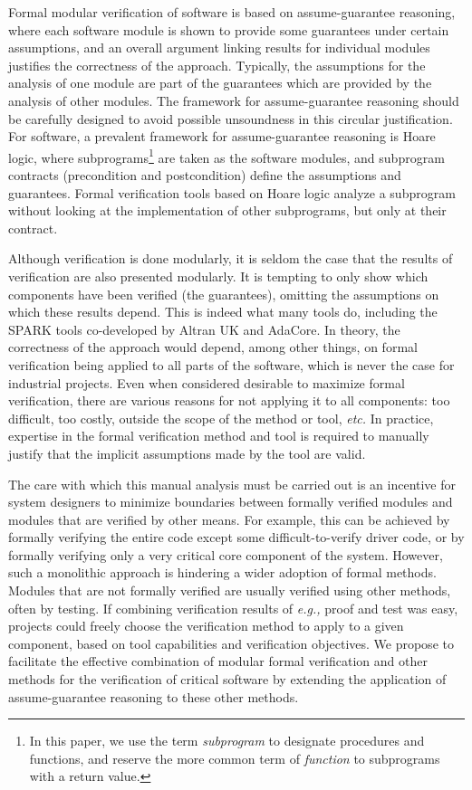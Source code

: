 \documentclass{llncs}
\newcommand{\spark}{SPARK\xspace}
\newcommand{\etc}{\textit{etc.}\xspace}
\newcommand{\eg}{\textit{e.g.,}\xspace}
\begin{document}
Formal modular verification of software is based on assume-guarantee
reasoning, where each software module is shown to provide some guarantees
under certain assumptions, and an overall argument linking results for
individual modules justifies the correctness of the approach. Typically, the
assumptions for the analysis of one module are part of the guarantees which
are provided by the analysis of other modules. The framework for
assume-guarantee reasoning should be carefully designed to avoid possible
unsoundness in this circular justification. For software, a prevalent
framework for assume-guarantee reasoning is Hoare logic, where
subprograms\footnote{In this paper, we use the term
{\em subprogram} to designate procedures and functions, and reserve the more
common term of {\em function} to subprograms with a return value.} are taken
as the software modules, and subprogram contracts (precondition and
postcondition) define the assumptions and guarantees. Formal verification
tools based on Hoare logic analyze a subprogram without looking at the
implementation of other subprograms, but only at their contract.

Although verification is done modularly, it is seldom the case that the
results of verification are also presented modularly. It is tempting to only
show which components have been verified (the guarantees), omitting the
assumptions on which these results depend. This is indeed what many tools
do, including the \spark tools co-developed by Altran UK and AdaCore.  In
theory, the correctness of the approach would depend, among other things, on
formal verification being applied to all parts of the software, which is never
the case for industrial projects. Even when considered desirable to maximize
formal verification, there are various reasons for not applying
it to all components: too difficult, too costly, outside the
scope of the method or tool, \etc In practice, expertise in the formal
verification method and tool is required to manually justify that the implicit
assumptions made by the tool are valid.

The care with which this manual analysis must be carried out is an incentive
for system designers to minimize boundaries between formally verified modules
and modules that are verified by other means. For example, this can be achieved
by formally verifying the entire code except some difficult-to-verify driver
code, or by formally verifying only a very critical core component of the
system.  However, such a monolithic approach is hindering a wider adoption of
formal methods.
Modules that are not formally verified are usually verified using other
methods, often by testing. If combining verification results of \eg proof and
test was easy, projects could freely choose the verification method to
apply to a given component, based on tool capabilities and verification
objectives.  We propose to facilitate the effective combination of modular
formal verification and other methods for the verification of critical software
by extending the application of assume-guarantee reasoning to these other methods.
\end{document}
